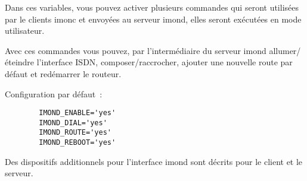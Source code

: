 \begin{description}

    {Dans ces variables, vous pouvez activer plusieurs commandes
     qui seront utilisées par le clients imonc et envoyées au serveur imond,
     elles seront exécutées en mode utilisateur.

      Avec ces commandes vous pouvez, par l'intermédiaire du serveur imond
      allumer/éteindre l'interface ISDN, composer/raccrocher, ajouter
      une nouvelle route par défaut et redémarrer le routeur.

      Configuration par défaut~:

\begin{example}
\begin{verbatim}
        IMOND_ENABLE='yes'
        IMOND_DIAL='yes'
        IMOND_ROUTE='yes'
        IMOND_REBOOT='yes'
\end{verbatim}
\end{example}

      Des dispositifs additionnels pour l'interface imond sont décrits
       pour le client et le serveur.}
  \end{description}

